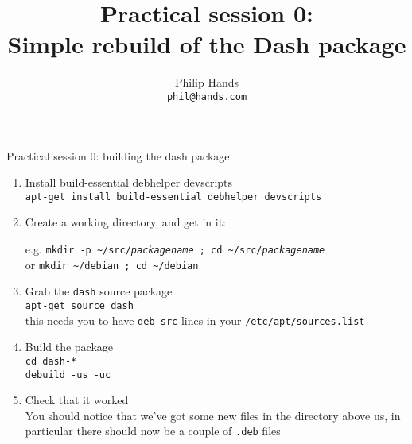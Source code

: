 \documentclass[10pt,final]{beamer}
\title[Practical session 0: dash]{Practical session 0:\\ Simple rebuild of the Dash package}
\author[]{Philip Hands\\{\small\texttt{phil@hands.com}}}
\institute{\texttt{[image: figs/openlogo-nd.pdf]}}
\date{}
\begin{document}
\frame{\titlepage}

\begin{frame}{Practical session 0: building the dash package}
\begin{enumerate}
\item Install build-essential debhelper devscripts\\
  {\small \texttt{apt-get install build-essential debhelper devscripts}}
  \hbr
\item Create a working directory, and get in it:\\
  \begin{tabbing}
    e.g. \= \texttt{mkdir -p \textasciitilde/src/\textsl{packagename} ; cd \textasciitilde/src/\textsl{packagename}}\\
    or   \> \texttt{mkdir \textasciitilde/debian ; cd \textasciitilde/debian}
  \end{tabbing}
  
\item Grab the \texttt{dash} source package\\
  \texttt{apt-get source dash}\\ 
  {\small this needs you to have \texttt{deb-src} lines in your \texttt{/etc/apt/sources.list}}
\item Build the package\\
  {\small \texttt{cd dash-*\\ debuild -us -uc}}

\item Check that it worked\\
  {\small You should notice that we've got some new
    files in the directory above us, in particular
    there should now be a couple of \texttt{.deb}
    files}
\end{enumerate}
\end{frame}
\end{document}
